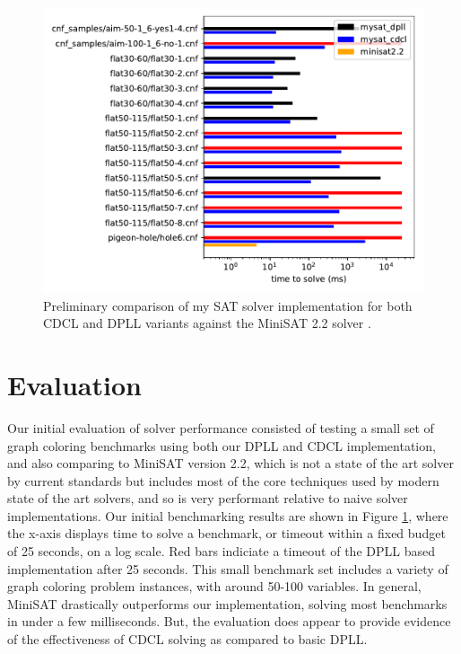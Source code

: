 \documentclass[12pt]{article}
\begin{document}
\begin{figure}
    \begin{center}
        \includegraphics[scale=0.6]{../results/compare.pdf}
    \end{center}
    \label{fig:benchmarks}
    \caption{Preliminary comparison of my SAT solver implementation for both CDCL and DPLL variants against the MiniSAT 2.2 solver \cite{minisat}. }
\end{figure}

\section{Evaluation}

Our initial evaluation of solver performance consisted of testing a small set of graph coloring benchmarks using both our DPLL and CDCL implementation, and also comparing to MiniSAT version 2.2, which is not a state of the art solver by current standards but includes most of the core techniques used by modern state of the art solvers, and so is very performant relative to naive solver implementations. Our initial benchmarking results are shown in Figure \ref{fig:benchmarks}, where the x-axis displays time to solve a benchmark, or timeout within a fixed budget of 25 seconds, on a log scale. Red bars indiciate a timeout of the DPLL based implementation after 25 seconds. This small benchmark set includes a variety of graph coloring problem instances, with around 50-100 variables. In general, MiniSAT drastically outperforms our implementation, solving most benchmarks in under a few milliseconds. But, the evaluation does appear to provide evidence of the effectiveness of CDCL solving as compared to basic DPLL.
\end{document}
